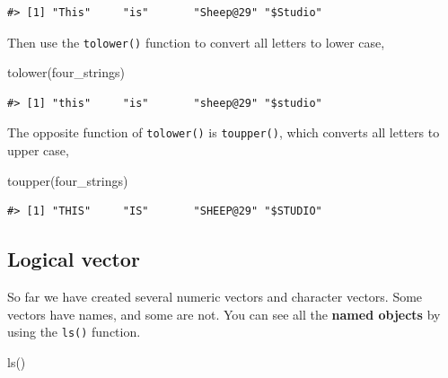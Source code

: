 \documentclass[
]{book}
\newenvironment{Shaded}{\begin{snugshade}}{\end{snugshade}}
\newcommand{\FunctionTok}[1]{\textcolor[rgb]{0.00,0.00,0.00}{#1}}
\newcommand{\NormalTok}[1]{#1}
\begin{document}
\begin{verbatim}
#> [1] "This"     "is"       "Sheep@29" "$Studio"
\end{verbatim}

Then use the \texttt{tolower()} function to convert all letters to lower case,

\begin{Shaded}
\begin{Highlighting}[]
\FunctionTok{tolower}\NormalTok{(four\_strings)}
\end{Highlighting}
\end{Shaded}

\begin{verbatim}
#> [1] "this"     "is"       "sheep@29" "$studio"
\end{verbatim}

The opposite function of \texttt{tolower()} is \texttt{toupper()}, which converts all letters to upper case,

\begin{Shaded}
\begin{Highlighting}[]
\FunctionTok{toupper}\NormalTok{(four\_strings)}
\end{Highlighting}
\end{Shaded}

\begin{verbatim}
#> [1] "THIS"     "IS"       "SHEEP@29" "$STUDIO"
\end{verbatim}

\hypertarget{logical-vector}{%
\subsection{Logical vector}\label{logical-vector}}

So far we have created several numeric vectors and character vectors. Some vectors have names, and some are not. You can see all the \textbf{named objects} by using the \texttt{ls()} function.

\begin{Shaded}
\begin{Highlighting}[]
\FunctionTok{ls}\NormalTok{()}
\end{Highlighting}
\end{Shaded}
\end{document}
